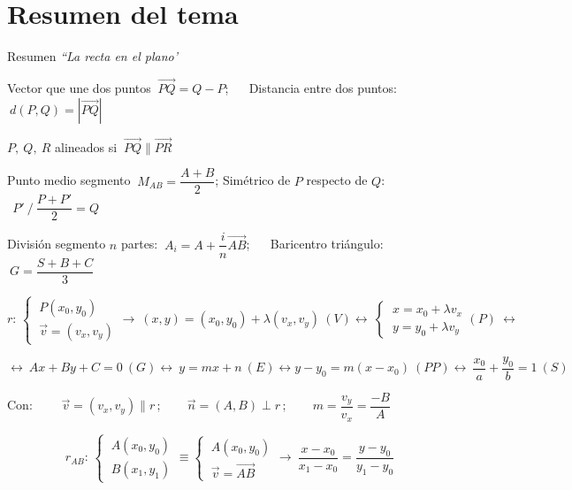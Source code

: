 \newpage
\section{Resumen del tema}
\vspace{1.5cm}	
	
	
\begin{myblock}{Resumen \emph{``La recta en el plano'}}

\vspace{1mm} Vector que une dos puntos $\ \overrightarrow{PQ}=Q-P$; $\quad$ Distancia entre dos puntos: $\ d(P,Q)=|\overrightarrow{PQ}|$

\vspace{2mm} $P, \ Q, \ R $ alineados si $\ \overrightarrow{PQ}\parallel \overrightarrow{PR}$

\vspace{2mm} Punto medio segmento $\ M_{AB}=\dfrac{A+B}{2}$; Simétrico de $P$ respecto de $Q$: $\ \ P'\ / \ \dfrac{P+P'}{2}=Q$

\vspace{2mm} División segmento $n$ partes: $\ A_i=A+\dfrac i n \overrightarrow{AB}$; $\quad$ Baricentro triángulo: $\ G=\dfrac{S+B+C}{3}$ 

\vspace{5mm} $r:\, \begin{cases} \ P(x_0,y_0) \\ \ \vec v=(v_x,v_y) \end{cases} \to \ (x,y)=(x_0,y_0)+\lambda (v_x,v_y) \ (V) \leftrightarrow \ \begin{cases} \ x=x_0+\lambda v_x \\ \ y=y_0+\lambda v_y \end{cases} (P)\ \leftrightarrow \ $

$\leftrightarrow \ Ax+By+C=0 \ (G) \leftrightarrow \ y=mx+n \ (E)\leftrightarrow y-y_0=m(x-x_0)\ (PP) \leftrightarrow \ \dfrac{x_0}{a}+\dfrac{y_0}{b}=1\ (S)$ 

\vspace{2mm} Con: $\qquad \vec v=(v_x,v_y)  \parallel r\, ;\qquad \vec n=(A,B) \perp r\, ; \qquad m=\dfrac{v_y}{v_x}=\dfrac{-B}{A}$

$$r_{AB}:\, \begin{cases} \ A(x_0,y_0)\\ \ B(x_1,y_1) \end{cases} \equiv \begin{cases} \ A(x_0,y_0) \\ \ \vec v=\overrightarrow{AB} \end{cases} \to \ \dfrac{x-x_0}{x_1-x_0}=\dfrac{y-y_0}{y_1-y_0}$$


\end{myblock}
